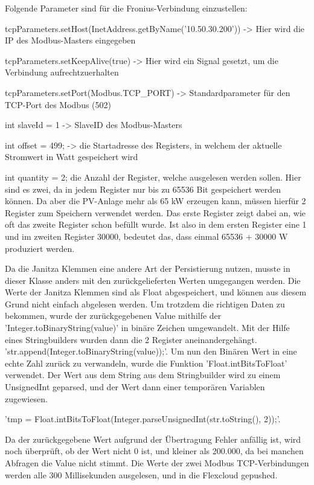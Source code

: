 Folgende Parameter sind für die Fronius-Verbindung einzustellen:

\begin{compactitem}
  \item tcpParameters.setHost(InetAddress.getByName('10.50.30.200')) -> Hier wird die IP des Modbus-Masters eingegeben
  \item tcpParameters.setKeepAlive(true) -> Hier wird ein Signal gesetzt, um die Verbindung aufrechtzuerhalten
  \item tcpParameters.setPort(Modbus.TCP\_PORT) -> Standardparameter für den TCP-Port des Modbus (502)
  \item int slaveId = 1 -> SlaveID des Modbus-Masters
  \item int offset = 499; -> die Startadresse des Registers, in welchem der aktuelle Stromwert in Watt gespeichert wird
  \item int quantity = 2; die Anzahl der Register, welche ausgelesen werden sollen. Hier sind es zwei, da in jedem Register nur bis zu 65536 Bit gespeichert werden können. Da aber die PV-Anlage mehr als 65 kW erzeugen kann, müssen hierfür 2 Register zum Speichern verwendet werden. Das erste Register zeigt dabei an, wie oft das zweite Register schon befüllt wurde. Ist also in dem ersten Register eine 1 und im zweiten Register 30000, bedeutet das, dass einmal 65536 + 30000 W produziert werden.
\end{compactitem}

Da die Janitza Klemmen eine andere Art der Persistierung nutzen, musste in dieser Klasse anders mit den zurückgelieferten Werten umgegangen werden. Die Werte der Janitza Klemmen sind als Float abgespeichert, und können aus diesem Grund nicht einfach abgelesen werden. Um trotzdem die richtigen Daten zu bekommen, wurde der zurückgegebenen Value mithilfe der 'Integer.toBinaryString(value)' in binäre Zeichen umgewandelt. Mit der Hilfe eines Stringbuilders wurden dann die 2 Register aneinandergehängt. 'str.append(Integer.toBinaryString(value));'. Um nun den Binären Wert in eine echte Zahl zurück zu verwandeln, wurde die Funktion 'Float.intBitsToFloat' verwendet. Der Wert aus dem String aus dem Stringbuilder wird zu einem UnsignedInt geparsed, und der Wert dann einer temporären Variablen zugewiesen. 

'tmp = Float.intBitsToFloat(Integer.parseUnsignedInt(str.toString(), 2));'. 

Da der zurückgegebene Wert aufgrund der Übertragung Fehler anfällig ist, wird noch überprüft, ob der Wert nicht 0 ist, und kleiner als 200.000, da bei manchen Abfragen die Value nicht stimmt. Die Werte der zwei Modbus TCP-Verbindungen werden alle 300 Millisekunden ausgelesen, und in die Flexcloud gepushed.


